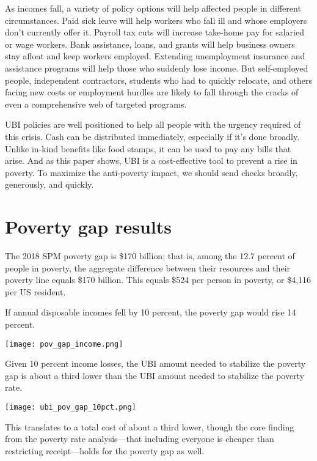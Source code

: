 \documentclass[12pt]{article}
\begin{document}
As incomes fall, a variety of policy options will help affected people in different circumstances. Paid sick leave will help workers who fall ill and whose employers don't currently offer it. Payroll tax cuts will increase take-home pay for salaried or wage workers. Bank assistance, loans, and grants will help business owners stay afloat and keep workers employed. Extending unemployment insurance and assistance programs will help those who suddenly lose income. But self-employed people, independent contractors, students who had to quickly relocate, and others facing new costs or employment hurdles are likely to fall through the cracks of even a comprehensive web of targeted programs.

UBI policies are well positioned to help all people with the urgency required of this crisis. Cash can be distributed immediately, especially if it's done broadly. Unlike in-kind benefits like food stamps, it can be used to pay any bills that arise. And as this paper shows, UBI is a cost-effective tool to prevent a rise in poverty. To maximize the anti-poverty impact, we should send checks broadly, generously, and quickly.

\appendix
\section{Poverty gap results} \label{sec:appendixa}

The 2018 SPM poverty gap is \$170 billion; that is, among the 12.7 percent of people in poverty, the aggregate difference between their resources and their poverty line equals \$170 billion. This equals \$524 per person in poverty, or \$4,116 per US resident.

If annual disposable incomes fell by 10 percent, the poverty gap would rise 14 percent.

\begin{center}
\texttt{[image: pov\_gap\_income.png]}
\label{fig:poverty}
\end{center}

Given 10 percent income losses, the UBI amount needed to stabilize the poverty gap is about a third lower than the UBI amount needed to stabilize the poverty rate.

\begin{center}
\texttt{[image: ubi\_pov\_gap\_10pct.png]}
\label{fig:poverty}
\end{center}

This translates to a total cost of about a third lower, though the core finding from the poverty rate analysis---that including everyone is cheaper than restricting receipt---holds for the poverty gap as well.
\end{document}
